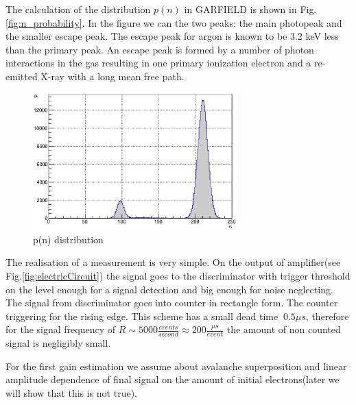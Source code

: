 \documentclass[12pt,a4paper]{article}
\begin{document}
	The calculation of the distribution 	$p(n)$  in GARFIELD is shown in Fig.\ref{fig:n_probability}. In the figure we can the two peaks: the main photopeak and the smaller escape peak. 
	The escape peak for argon is known to be 3.2 keV less than the primary peak. An escape peak is formed by a number of photon interactions in the gas resulting in one primary ionization electron and a re-emitted X-ray with a long mean free path.
	
	\begin{figure}[!h]
	\centering
	\includegraphics[width=0.7\textwidth]{fe55neGamma}
	\caption{ p(n) distribution}
	\label{fig:fe55_n_probability}
	\end{figure}
	
	The realisation of a measurement is very simple.  On the output of amplifier(see Fig.\ref{fig:electricCircuit}) the signal goes to the discriminator with  trigger threshold on the level enough for a signal detection and big enough for noise neglecting. The signal from discriminator goes into counter in rectangle form. The counter triggering for the rising edge. This scheme has a small dead time $~0.5 \mu s$, therefore for the signal frequency of $R \sim 5000 \frac{events}{second} \approx 200 \frac{\mu s}{event}$ the amount of non counted signal is negligibly small.
	
	For the first gain estimation we assume about avalanche superposition and linear amplitude dependence of final signal on the amount of initial electrons(later we will show that this is not true).
	
\end{document}
